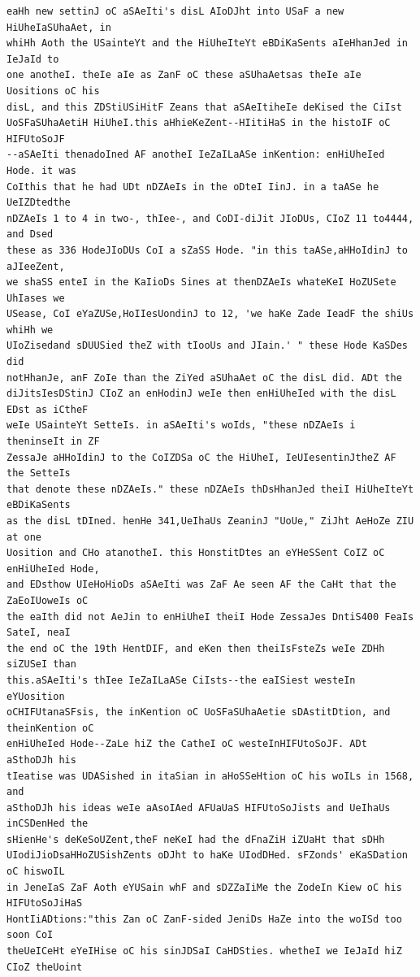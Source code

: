 \documentclass[12pt,a4paper]{article}
\begin{document}
\begin{lstlisting}[caption={Complete text after iteration 7}, label={lst:iter7}]
eaHh new settinJ oC aSAeIti's disL AIoDJht into USaF a new HiUheIaSUhaAet, in
whiHh Aoth the USainteYt and the HiUheIteYt eBDiKaSents aIeHhanJed in IeJaId to
one anotheI. theIe aIe as ZanF oC these aSUhaAetsas theIe aIe Uositions oC his
disL, and this ZDStiUSiHitF Zeans that aSAeItiheIe deKised the CiIst
UoSFaSUhaAetiH HiUheI.this aHhieKeZent--HIitiHaS in the histoIF oC HIFUtoSoJF
--aSAeIti thenadoIned AF anotheI IeZaILaASe inKention: enHiUheIed Hode. it was
CoIthis that he had UDt nDZAeIs in the oDteI IinJ. in a taASe he UeIZDtedthe
nDZAeIs 1 to 4 in two-, thIee-, and CoDI-diJit JIoDUs, CIoZ 11 to4444, and Dsed
these as 336 HodeJIoDUs CoI a sZaSS Hode. "in this taASe,aHHoIdinJ to aJIeeZent,
we shaSS enteI in the KaIioDs Sines at thenDZAeIs whateKeI HoZUSete UhIases we
USease, CoI eYaZUSe,HoIIesUondinJ to 12, 'we haKe Zade IeadF the shiUs whiHh we
UIoZisedand sDUUSied theZ with tIooUs and JIain.' " these Hode KaSDes did
notHhanJe, anF ZoIe than the ZiYed aSUhaAet oC the disL did. ADt the
diJitsIesDStinJ CIoZ an enHodinJ weIe then enHiUheIed with the disL EDst as iCtheF
weIe USainteYt SetteIs. in aSAeIti's woIds, "these nDZAeIs i theninseIt in ZF
ZessaJe aHHoIdinJ to the CoIZDSa oC the HiUheI, IeUIesentinJtheZ AF the SetteIs
that denote these nDZAeIs." these nDZAeIs thDsHhanJed theiI HiUheIteYt eBDiKaSents
as the disL tDIned. henHe 341,UeIhaUs ZeaninJ "UoUe," ZiJht AeHoZe ZIU at one
Uosition and CHo atanotheI. this HonstitDtes an eYHeSSent CoIZ oC enHiUheIed Hode,
and EDsthow UIeHoHioDs aSAeIti was ZaF Ae seen AF the CaHt that the ZaEoIUoweIs oC
the eaIth did not AeJin to enHiUheI theiI Hode ZessaJes DntiS400 FeaIs SateI, neaI
the end oC the 19th HentDIF, and eKen then theiIsFsteZs weIe ZDHh siZUSeI than
this.aSAeIti's thIee IeZaILaASe CiIsts--the eaISiest westeIn eYUosition
oCHIFUtanaSFsis, the inKention oC UoSFaSUhaAetie sDAstitDtion, and theinKention oC
enHiUheIed Hode--ZaLe hiZ the CatheI oC westeInHIFUtoSoJF. ADt aSthoDJh his
tIeatise was UDASished in itaSian in aHoSSeHtion oC his woILs in 1568, and
aSthoDJh his ideas weIe aAsoIAed AFUaUaS HIFUtoSoJists and UeIhaUs inCSDenHed the
sHienHe's deKeSoUZent,theF neKeI had the dFnaZiH iZUaHt that sDHh
UIodiJioDsaHHoZUSishZents oDJht to haKe UIodDHed. sFZonds' eKaSDation oC hiswoIL
in JeneIaS ZaF Aoth eYUSain whF and sDZZaIiMe the ZodeIn Kiew oC his HIFUtoSoJiHaS
HontIiADtions:"this Zan oC ZanF-sided JeniDs HaZe into the woISd too soon CoI
theUeICeHt eYeIHise oC his sinJDSaI CaHDSties. whetheI we IeJaId hiZ CIoZ theUoint

\end{lstlisting}
\end{document}

